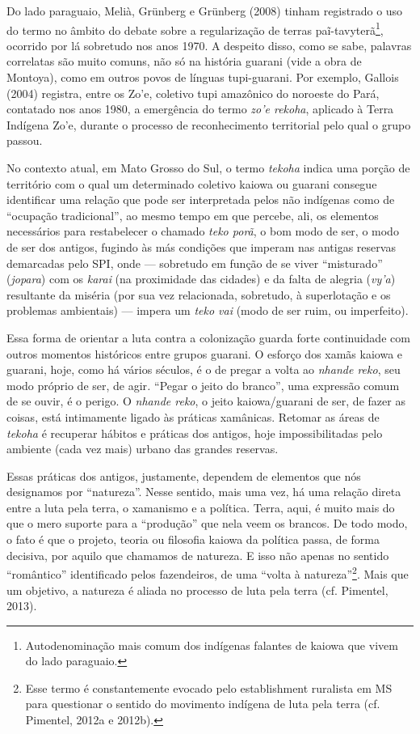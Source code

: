 Do lado paraguaio, Melià, Grünberg e Grünberg (2008) tinham registrado o
uso do termo no âmbito do debate sobre a regularização de terras
paĩ-tavyterã\footnote{Autodenominação mais comum dos indígenas falantes
  de kaiowa que vivem do lado paraguaio.}, ocorrido por lá sobretudo nos
anos 1970. A despeito disso, como se sabe, palavras correlatas são muito
comuns, não só na história guarani (vide a obra de Montoya), como em
outros povos de línguas tupi-guarani. Por exemplo, Gallois (2004)
registra, entre os Zo'e, coletivo tupi amazônico do noroeste do Pará,
contatado nos anos 1980, a emergência do termo \emph{zo'e rekoha},
aplicado à Terra Indígena Zo'e, durante o processo de reconhecimento
territorial pelo qual o grupo passou.

No contexto atual, em Mato Grosso do Sul, o termo \emph{tekoha} indica
uma porção de território com o qual um determinado coletivo kaiowa ou
guarani consegue identificar uma relação que pode ser interpretada pelos
não indígenas como de ``ocupação tradicional'', ao mesmo tempo em que
percebe, ali, os elementos necessários para restabelecer o chamado
\emph{teko porã}, o bom modo de ser, o modo de ser dos antigos, fugindo
às más condições que imperam nas antigas reservas demarcadas pelo SPI,
onde --- sobretudo em função de se viver ``misturado'' (\emph{jopara})
com os \emph{karai} (na proximidade das cidades) e da falta de alegria
(\emph{vy'a}) resultante da miséria (por sua vez relacionada, sobretudo,
à superlotação e os problemas ambientais) --- impera um \emph{teko vai}
(modo de ser ruim, ou imperfeito).

Essa forma de orientar a luta contra a colonização guarda forte
continuidade com outros momentos históricos entre grupos guarani. O
esforço dos xamãs kaiowa e guarani, hoje, como há vários séculos, é o de
pregar a volta ao \emph{nhande reko}, seu modo próprio de ser, de
agir\emph{.} ``Pegar o jeito do branco'', uma expressão comum de se
ouvir, é o perigo. O \emph{nhande reko}, o jeito kaiowa/guarani de ser,
de fazer as coisas, está intimamente ligado às práticas xamânicas.
Retomar as áreas de \emph{tekoha} é recuperar hábitos e práticas dos
antigos, hoje impossibilitadas pelo ambiente (cada vez mais) urbano das
grandes reservas.

Essas práticas dos antigos, justamente, dependem de elementos que nós
designamos por ``natureza''. Nesse sentido, mais uma vez, há uma relação
direta entre a luta pela terra, o xamanismo e a política. Terra, aqui, é
muito mais do que o mero suporte para a ``produção'' que nela veem os
brancos. De todo modo, o fato é que o projeto, teoria ou filosofia
kaiowa da política passa, de forma decisiva, por aquilo que chamamos de
natureza. E isso não apenas no sentido ``romântico'' identificado pelos
fazendeiros, de uma ``volta à natureza''\footnote{Esse termo é
  constantemente evocado pelo establishment ruralista em MS para
  questionar o sentido do movimento indígena de luta pela terra (cf.
  Pimentel, 2012a e 2012b).}. Mais que um objetivo, a natureza é aliada
no processo de luta pela terra (cf. Pimentel, 2013).


